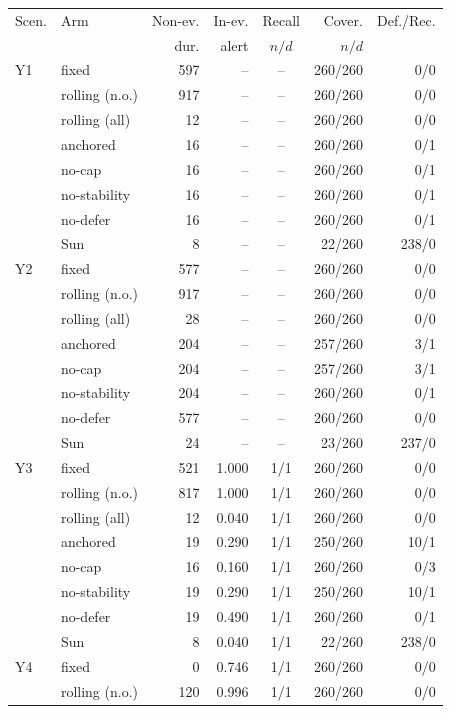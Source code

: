 \begin{tabular}{llrrcrr}
\toprule
Scen. & Arm & Non-ev. & In-ev. & Recall & Cover. & Def./Rec. \\
& & dur. & alert & $n/d$ & $n/d$ & \\
\midrule
Y1 & fixed & 597 & -- & -- & 260/260 & 0/0 \\
 & rolling (n.o.) & 917 & -- & -- & 260/260 & 0/0 \\
 & rolling (all) & 12 & -- & -- & 260/260 & 0/0 \\
 & anchored & 16 & -- & -- & 260/260 & 0/1 \\
 & no-cap & 16 & -- & -- & 260/260 & 0/1 \\
 & no-stability & 16 & -- & -- & 260/260 & 0/1 \\
 & no-defer & 16 & -- & -- & 260/260 & 0/1 \\
 & Sun & 8 & -- & -- & 22/260 & 238/0 \\
\midrule
Y2 & fixed & 577 & -- & -- & 260/260 & 0/0 \\
 & rolling (n.o.) & 917 & -- & -- & 260/260 & 0/0 \\
 & rolling (all) & 28 & -- & -- & 260/260 & 0/0 \\
 & anchored & 204 & -- & -- & 257/260 & 3/1 \\
 & no-cap & 204 & -- & -- & 257/260 & 3/1 \\
 & no-stability & 204 & -- & -- & 260/260 & 0/1 \\
 & no-defer & 577 & -- & -- & 260/260 & 0/0 \\
 & Sun & 24 & -- & -- & 23/260 & 237/0 \\
\midrule
Y3 & fixed & 521 & 1.000 & 1/1 & 260/260 & 0/0 \\
 & rolling (n.o.) & 817 & 1.000 & 1/1 & 260/260 & 0/0 \\
 & rolling (all) & 12 & 0.040 & 1/1 & 260/260 & 0/0 \\
 & anchored & 19 & 0.290 & 1/1 & 250/260 & 10/1 \\
 & no-cap & 16 & 0.160 & 1/1 & 260/260 & 0/3 \\
 & no-stability & 19 & 0.290 & 1/1 & 250/260 & 10/1 \\
 & no-defer & 19 & 0.490 & 1/1 & 260/260 & 0/1 \\
 & Sun & 8 & 0.040 & 1/1 & 22/260 & 238/0 \\
\midrule
Y4 & fixed & 0 & 0.746 & 1/1 & 260/260 & 0/0 \\
 & rolling (n.o.) & 120 & 0.996 & 1/1 & 260/260 & 0/0 \\

\end{tabular}
